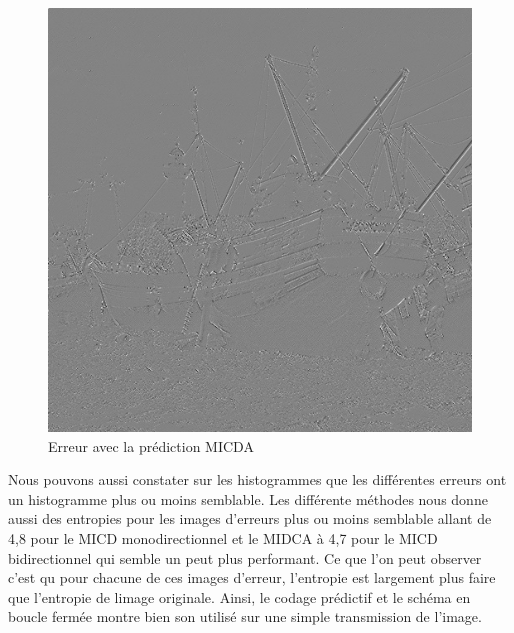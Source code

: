 \documentclass[12pt]{report}
\begin{document}
\begin{figure}[H]
\begin{center}
\includegraphics[scale=0.4]{../ImageRes/ImagecodeeMICDAQ1.jpg} 
\caption{Erreur avec la prédiction MICDA}
\end{center}
\end{figure}

Nous pouvons aussi constater sur les histogrammes que les différentes erreurs ont un histogramme plus ou moins semblable. Les différente méthodes nous donne aussi des entropies pour les images d'erreurs plus ou moins semblable allant de 4,8 pour le MICD monodirectionnel et le MIDCA à 4,7 pour le MICD bidirectionnel qui semble un peut plus performant. Ce que l'on peut observer c'est qu pour chacune de ces images d'erreur, l'entropie est largement plus faire que l'entropie de limage originale. Ainsi, le codage prédictif et le schéma en boucle fermée montre bien son utilisé sur une simple transmission de l'image.
\end{document}
